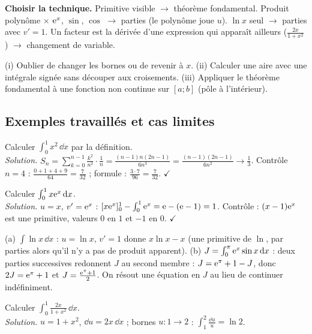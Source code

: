 \begin{methode}
\textbf{Choisir la technique.} Primitive visible $\to$ théorème fondamental. Produit polynôme $\times$ $\mathrm{e}^x$, $\sin$, $\cos$ $\to$ parties (le polynôme joue $u$). $\ln x$ seul $\to$ parties avec $v'=1$. Un facteur est la dérivée d'une expression qui apparaît ailleurs ($\frac{2x}{1+x^2}$) $\to$ changement de variable.
\end{methode}
\begin{piege}
(i) Oublier de changer les bornes ou de revenir à $x$. (ii) Calculer une \og aire \fg{} avec une intégrale signée sans découper aux croisements. (iii) Appliquer le théorème fondamental à une fonction non continue sur $[a;b]$ (pôle à l'intérieur).
\end{piege}

\subsection{Exemples travaillés et cas limites}
\begin{exemple}
Calculer $\int_0^1x^2\,\dd x$ par la définition.\\
\emph{Solution.} $S_n=\sum_{k=0}^{n-1}\frac{k^2}{n^2}\cdot\frac1n=\frac{(n-1)n(2n-1)}{6n^3}=\frac{(n-1)(2n-1)}{6n^2}\to\frac13$. Contrôle $n=4$ : $\frac{0+1+4+9}{64}=\frac7{32}$ ; formule : $\frac{3\cdot7}{96}=\frac7{32}$. $\checkmark$
\end{exemple}
\begin{exemple}
Calculer $\int_0^1x\mathrm{e}^x\,\mathrm{d} x$.\\
\emph{Solution.} $u=x$, $v'=\mathrm{e}^x$ : $[x\mathrm{e}^x]_0^1-\int_0^1\mathrm{e}^x=\mathrm{e}-(\mathrm{e}-1)=1$. Contrôle : $(x-1)\mathrm{e}^x$ est une primitive, valeurs $0$ en $1$ et $-1$ en $0$. $\checkmark$
\end{exemple}
\begin{cas}
(a) $\int\ln x\,\dd x$ : $u=\ln x$, $v'=1$ donne $x\ln x-x$ (une primitive de $\ln$, par parties alors qu'il n'y a pas de produit apparent). (b) $J=\int_0^\pi\mathrm{e}^x\sin x\,\mathrm{d} x$ : deux parties successives redonnent $J$ au second membre : $J=\mathrm{e}^\pi+1-J$, donc $2J=\mathrm{e}^\pi+1$ et $J=\frac{\mathrm{e}^\pi+1}2$. On résout une équation en $J$ au lieu de continuer indéfiniment.
\end{cas}
\begin{exemple}
Calculer $\int_0^1\frac{2x}{1+x^2}\,\dd x$.\\
\emph{Solution.} $u=1+x^2$, $\dd u=2x\,\dd x$ ; bornes $u:1\to2$ : $\int_1^2\frac{\dd u}u=\ln2$.
\end{exemple}
